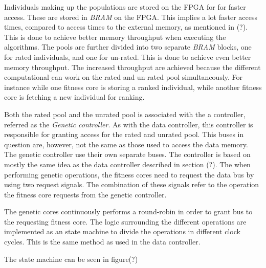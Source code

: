 Individuals making up the populations are stored on the FPGA for for faster access. These are stored in \emph{BRAM} on the FPGA. This implies a lot faster access times, compared to access times to the external memory, as mentioned in (?). This is done to achieve better memory throughput when executing the algorithms. The pools are further divided into two separate \emph{BRAM} blocks, one for rated individuals, and one for un-rated. This is done to achieve even better memory throughput. The increased throughput are achieved because the different computational can work on the rated and un-rated pool simultaneously. For instance while one fitness core is storing a ranked individual, while another fitness core is fetching a new individual for ranking. 


Both the rated pool and the unrated pool is associated with the a controller, referred as the \emph{Genetic controller}. As with the data controller, this controller is responsible for granting access for the rated and unrated pool. This buses in question are, however, not the same as those used to access the data memory. The genetic controller use their own separate buses. The controller is based on mostly the same idea as the data controller described in section (?). The when performing genetic operations, the fitness cores need to request the data bus by using two request signals. The combination of these signals refer to the operation the fitness core requests from the genetic controller. 

The genetic cores continuously performs a round-robin in order to grant bus to the requesting fitness core. The logic surrounding the different operations are implemented as an state machine to divide the operations in different clock cycles. This is the same method as used in the data controller.







The state machine can be seen in figure(?)


